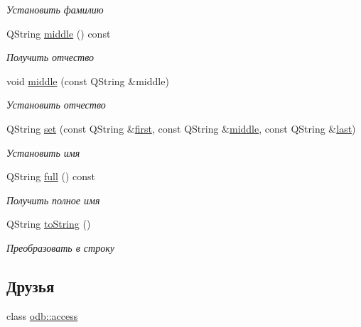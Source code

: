 \begin{DoxyCompactItemize}
\begin{DoxyCompactList}\small\item\em Установить фамилию \end{DoxyCompactList}\item 
Q\+String \hyperlink{classkpk_1_1data_1_1_name_a6193fa09a5adf9ee2eb3a5a448578ec7}{middle} () const 
\begin{DoxyCompactList}\small\item\em Получить отчество \end{DoxyCompactList}\item 
void \hyperlink{classkpk_1_1data_1_1_name_ad65653506f46a201cf903e383d558421}{middle} (const Q\+String \&middle)
\begin{DoxyCompactList}\small\item\em Установить отчество \end{DoxyCompactList}\item 
Q\+String \hyperlink{classkpk_1_1data_1_1_name_acf3d804bb9ffbe68658c09fdb2e55594}{set} (const Q\+String \&\hyperlink{classkpk_1_1data_1_1_name_aad406c47e17e1c528c8fb20b81ca0c0b}{first}, const Q\+String \&\hyperlink{classkpk_1_1data_1_1_name_a6193fa09a5adf9ee2eb3a5a448578ec7}{middle}, const Q\+String \&\hyperlink{classkpk_1_1data_1_1_name_a99905897dea9f8bb74ce3b7bddd9207d}{last})
\begin{DoxyCompactList}\small\item\em Установить имя \end{DoxyCompactList}\item 
Q\+String \hyperlink{classkpk_1_1data_1_1_name_acbf4a111e14d5ce921cfa6bc2739af20}{full} () const 
\begin{DoxyCompactList}\small\item\em Получить полное имя \end{DoxyCompactList}\item 
Q\+String \hyperlink{classkpk_1_1data_1_1_name_a13c582ae0f4b54b30ff22480fe75c609}{to\+String} ()
\begin{DoxyCompactList}\small\item\em Преобразовать в строку \end{DoxyCompactList}\end{DoxyCompactItemize}
\subsection*{Друзья}
\begin{DoxyCompactItemize}
\item 
class \hyperlink{classkpk_1_1data_1_1_name_acb4d953abf85ae525f1d06a0c3a86a55}{odb\+::access}
\end{DoxyCompactItemize}


